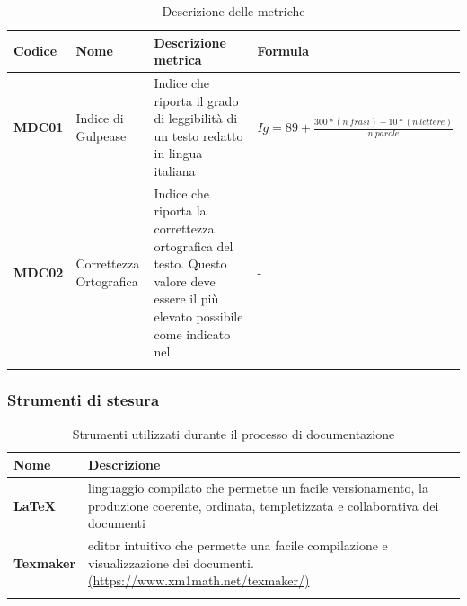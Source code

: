 {{{
	\setlength{\freewidth}{\dimexpr\textwidth-0\tabcolsep}
	\renewcommand{\arraystretch}{1.5}
	\setlength{\aboverulesep}{0pt}
	\setlength{\belowrulesep}{0pt}
	\begin{longtable}{L{.1\freewidth} L{.15\freewidth} L{.3\freewidth} L{.35\freewidth}}
		\textbf{Codice} & \textbf{Nome} & \textbf{Descrizione metrica} & \textbf{Formula}\\
		\toprule
		\endhead		
		\textbf{MDC01} & Indice di Gulpease & Indice che riporta il grado di leggibilità di un testo redatto in lingua italiana & \small{$Ig= 89 + \frac{300 * (n\ frasi) - 10 * (n\ lettere)}{n\ parole}$} \\
		\textbf{MDC02} & Correttezza Ortografica & Indice che riporta la correttezza ortografica del testo. Questo valore deve essere il più elevato possibile come indicato nel \PdQ{} & - \\
		
		\bottomrule
		\hiderowcolors
		\caption{Descrizione delle metriche}\\
	\end{longtable}
}


\subsubsection{Strumenti di stesura}

	\setlength{\freewidth}{\dimexpr\textwidth-1\tabcolsep}
	\renewcommand{\arraystretch}{1.5}
	\setlength{\aboverulesep}{0pt}
	\setlength{\belowrulesep}{0pt}
	\begin{longtable}{L{.210\freewidth} L{.75\freewidth} L{.080\freewidth}}
		\textbf{Nome} & \textbf{Descrizione} \\
		\toprule
		\endhead		
		\textbf{\LaTeX} & linguaggio compilato che permette un facile versionamento, la produzione coerente, ordinata, templetizzata e collaborativa dei documenti \\
		\textbf{Texmaker} & editor intuitivo che permette una facile compilazione e visualizzazione dei documenti. \newline \url{(https://www.xm1math.net/texmaker/)}\\
		\bottomrule
		\hiderowcolors
		\caption{Strumenti utilizzati durante il processo di documentazione}
	\end{longtable}

}}
